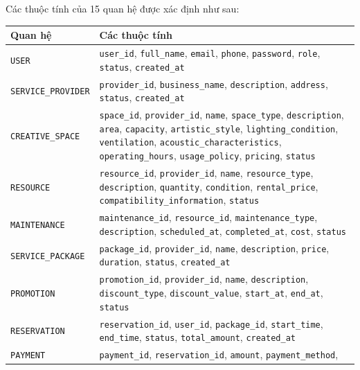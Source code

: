 Các thuộc tính của 15 quan hệ được xác định như sau:

\begin{table}[htbp]
\centering
\scriptsize
\setlength{\tabcolsep}{2pt}
\begin{tabular}{|p{.20\linewidth}|p{.75\linewidth}|}
\hline
\textbf{Quan hệ} & \textbf{Các thuộc tính} \\
\hline
\texttt{USER} &
\texttt{user\_id}, \texttt{full\_name}, \texttt{email}, \texttt{phone}, \texttt{password},
\texttt{role}, \texttt{status}, \texttt{created\_at} \\
\hline
\texttt{SERVICE\_PROVIDER} &
\texttt{provider\_id}, \texttt{business\_name}, \texttt{description}, \texttt{address},
\texttt{status}, \texttt{created\_at} \\
\hline
\texttt{CREATIVE\_SPACE} &
\texttt{space\_id}, \texttt{provider\_id}, \texttt{name}, \texttt{space\_type},
\texttt{description}, \texttt{area}, \texttt{capacity}, \texttt{artistic\_style},
\texttt{lighting\_condition}, \texttt{ventilation}, \texttt{acoustic\_characteristics},
\texttt{operating\_hours}, \texttt{usage\_policy}, \texttt{pricing}, \texttt{status} \\
\hline
\texttt{RESOURCE} &
\texttt{resource\_id}, \texttt{provider\_id}, \texttt{name}, \texttt{resource\_type},
\texttt{description}, \texttt{quantity}, \texttt{condition}, \texttt{rental\_price},
\texttt{compatibility\_information}, \texttt{status} \\
\hline
\texttt{MAINTENANCE} &
\texttt{maintenance\_id}, \texttt{resource\_id}, \texttt{maintenance\_type},
\texttt{description}, \texttt{scheduled\_at}, \texttt{completed\_at}, \texttt{cost},
\texttt{status} \\
\hline
\texttt{SERVICE\_PACKAGE} &
\texttt{package\_id}, \texttt{provider\_id}, \texttt{name}, \texttt{description},
\texttt{price}, \texttt{duration}, \texttt{status}, \texttt{created\_at} \\
\hline
\texttt{PROMOTION} &
\texttt{promotion\_id}, \texttt{provider\_id}, \texttt{name}, \texttt{description},
\texttt{discount\_type}, \texttt{discount\_value}, \texttt{start\_at}, \texttt{end\_at},
\texttt{status} \\
\hline
\texttt{RESERVATION} &
\texttt{reservation\_id}, \texttt{user\_id}, \texttt{package\_id}, \texttt{start\_time},
\texttt{end\_time}, \texttt{status}, \texttt{total\_amount}, \texttt{created\_at} \\
\hline
\texttt{PAYMENT} &
\texttt{payment\_id}, \texttt{reservation\_id}, \texttt{amount}, \texttt{payment\_method},

\end{tabular}
\end{table}
